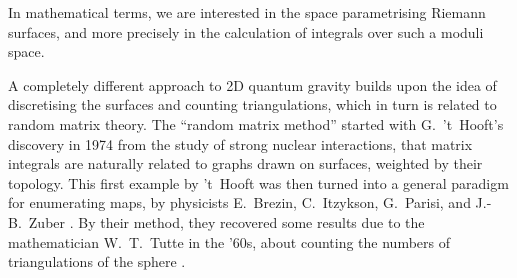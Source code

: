 \documentclass[11pt,reqno]{amsart}
\numberwithin{equation}{section}
\theoremstyle{plain}
\theoremstyle{definition}
\begin{document}
In mathematical terms, we are interested in the space parametrising Riemann surfaces, and more precisely in the calculation of integrals over such a moduli space.

A completely different approach to 2D quantum gravity builds upon the idea of discretising the surfaces and counting triangulations, which in turn is related to random matrix theory.
The ``random matrix method'' started with G.~'t~Hooft's discovery in 1974 \cite{Hoo74} from the study of strong nuclear interactions, that matrix integrals are naturally related to graphs drawn on surfaces, weighted by their topology. 
This first example by 't~Hooft was then turned into a general paradigm for enumerating maps, by physicists E.~Brezin, C.~Itzykson, G.~Parisi, and J.-B.~Zuber \cite{BIPZ78}. 
By their method, they recovered some results due to the mathematician W.~T.~Tutte in the '60s, about counting the numbers of triangulations of the sphere \cite{Tut68}. 
\end{document}
